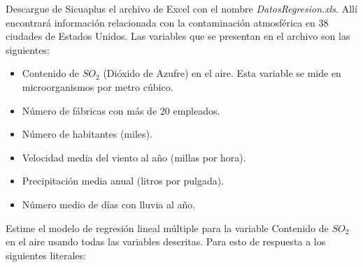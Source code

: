 \documentclass[../main.tex]{subfiles}
\begin{document}
Descargue de Sicuaplus el archivo de Excel con el nombre \textit{DatosRegresion.xls}. Allí encontrará información relacionada con la contaminación atmosférica en 38 ciudades de Estados Unidos. Las variables que se presentan en el archivo son las siguientes:

\begin{itemize}
  \item Contenido de $SO_2$ (Dióxido de Azufre) en el aire. Esta variable se mide en microorganismos por metro cúbico.
  \item Número de fábricas con más de 20 empleados.
  \item Número de habitantes (miles).
  \item Velocidad media del viento al año (millas por hora).
  \item Precipitación media anual (litros por pulgada).
  \item Número medio de días con lluvia al año.
\end{itemize}

Estime el modelo de regresión lineal múltiple para la variable Contenido de $SO_2$ en el aire usando todas las variables descritas. Para esto de respuesta a los siguientes literales:
\end{document}
